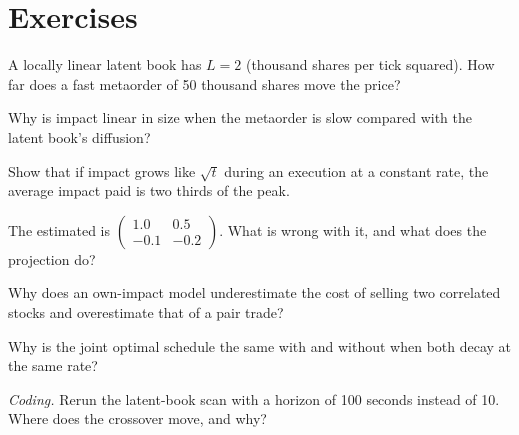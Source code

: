 \section{Exercises}

\begin{exercise}[$\star$]\label{exo:mx:metaorders-latent-liquidity-and-cross-impact:1}
A locally linear latent book has $L=2$ (thousand shares per tick squared). How far does a fast metaorder of 50 thousand shares move the price?
\end{exercise}

\begin{exercise}[$\star$]\label{exo:mx:metaorders-latent-liquidity-and-cross-impact:2}
Why is impact linear in size when the metaorder is slow compared with the latent book's diffusion?
\end{exercise}

\begin{exercise}[$\star$]\label{exo:mx:metaorders-latent-liquidity-and-cross-impact:3}
Show that if impact grows like $\sqrt t$ during an execution at a constant rate, the average impact paid is two thirds of the peak.
\end{exercise}

\begin{exercise}[$\star\star$]\label{exo:mx:metaorders-latent-liquidity-and-cross-impact:4}
The estimated  is $\begin{pmatrix}1.0&0.5\\-0.1&-0.2\end{pmatrix}$. What is wrong with it, and what does the projection do?
\end{exercise}

\begin{exercise}[$\star\star$]\label{exo:mx:metaorders-latent-liquidity-and-cross-impact:5}
Why does an own-impact model underestimate the cost of selling two correlated stocks and overestimate that of a pair trade?
\end{exercise}

\begin{exercise}[$\star\star$]\label{exo:mx:metaorders-latent-liquidity-and-cross-impact:6}
Why is the joint optimal schedule the same with and without  when both decay at the same rate?
\end{exercise}

\begin{exercise}[$\star\star\star$]\label{exo:mx:metaorders-latent-liquidity-and-cross-impact:7}
\emph{Coding.} Rerun the latent-book scan with a horizon of 100 seconds instead of 10. Where does the crossover move, and why?
\end{exercise}

